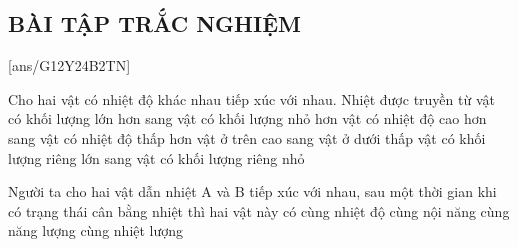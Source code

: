 \subsection{BÀI TẬP TRẮC NGHIỆM}
[ans/G12Y24B2TN]
\begin{ex}
	Cho hai vật có nhiệt độ khác nhau tiếp xúc với nhau. Nhiệt được truyền từ
	\choice
	{vật có khối lượng lớn hơn sang vật có khối lượng nhỏ hơn}
	{\True vật có nhiệt độ cao hơn sang vật có nhiệt độ thấp hơn}
	{vật ở trên cao sang vật ở dưới thấp}
	{vật có khối lượng riêng lớn sang vật có khối lượng riêng nhỏ}
	\loigiai{

}
	\end{ex}
\begin{ex}
Người ta cho hai vật dẫn nhiệt A và B tiếp xúc với nhau, sau một thời gian khi có trạng thái cân bằng nhiệt thì hai vật này có
	\choice
	{\True cùng nhiệt độ}
	{cùng nội năng}
	{cùng năng lượng}
	{cùng nhiệt lượng}
	\loigiai{
	
}
\end{ex}

